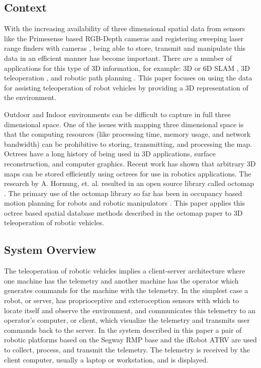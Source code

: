 \documentclass[journal]{IEEEtran}
\begin{document}
  \subsection{Context}
  With the increasing availability of three dimensional spatial data from 
  sensors like the Primesense based RGB-Depth cameras \cite{PRIMESENSE} and 
  registering sweeping laser range finders with cameras \cite{5457431}, being 
  able to store, transmit and manipulate this data in an efficient manner has 
  become important.  There are a number of applications for this type of 3D 
  information, for example: 3D or 6D SLAM \cite{biswasdepth}, 3D 
  teleoperation \cite{5457431}, and robotic path planning \cite{3DCOLLISION}.
  This paper focuses on using the data for assisting teleoperation of 
  robot vehicles by providing a 3D representation of the environment.
  
  Outdoor and Indoor environments can be difficult to capture in full three
  dimensional space. One of the issues with mapping three dimensional space is
  that the computing resources (like processing time, memory usage, and
  network bandwidth) can be prohibitive to storing, transmitting, and
  processing the map. Octrees have a long history of being used in 3D
  applications\cite{boada2001multiresolution}, surface
  reconstruction\cite{kazhdan2006poisson}, and computer
  graphics\cite{fang1996deformable}. Recent work has shown that arbitrary 3D
  maps can be stored efficiently using octrees for use in robotics
  applications\cite{octomap}. The research by A. Hornung, et. al. resulted in
  an open source library called octomap \cite{octomap}. The primary use of the
  octomap library so far has been in occupancy based motion planning for
  robots and robotic manipulators \cite{3DCOLLISION}. This paper applies this
  octree based spatial database methods described in the octomap paper to 3D
  teleoperation of robotic vehicles.
  
  \subsection{System Overview}
  The teleoperation of robotic vehicles implies a client-server architecture 
  where one machine has the telemetry and another machine has the operator 
  which generates commands for the machine with the telemetry.  In the 
  simplest case a robot, or server, has proprioceptive and exteroception 
  sensors with which to locate itself and observe the environment, and 
  communicates this telemetry to an operator's computer, or client, which 
  visualize the telemetry and transmits user commands back to the server.  In 
  the system described in this paper a pair of robotic platforms based on the 
  Segway RMP base and the iRobot ATRV are used to collect, process, and 
  transmit the telemetry.  The telemetry is received by the client computer, 
  usually a laptop or workstation, and is displayed.
  
\end{document}
